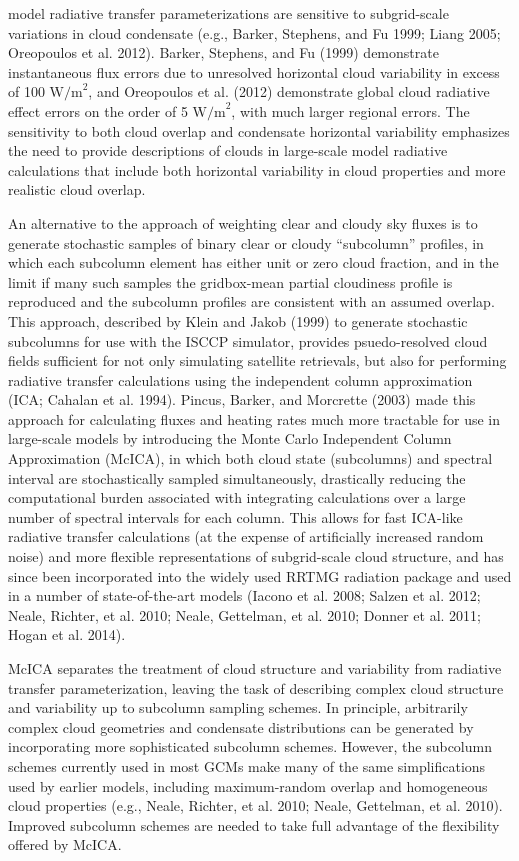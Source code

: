 model radiative transfer parameterizations are sensitive to
subgrid-scale variations in cloud condensate (e.g., Barker, Stephens,
and Fu 1999; Liang 2005; Oreopoulos et al. 2012). Barker, Stephens, and
Fu (1999) demonstrate instantaneous flux errors due to unresolved
horizontal cloud variability in excess of 100 \(\textrm{W/m}^2\), and
Oreopoulos et al. (2012) demonstrate global cloud radiative effect
errors on the order of 5 \(\textrm{W/m}^2\), with much larger regional
errors. The sensitivity to both cloud overlap and condensate horizontal
variability emphasizes the need to provide descriptions of clouds in
large-scale model radiative calculations that include both horizontal
variability in cloud properties and more realistic cloud overlap.

An alternative to the approach of weighting clear and cloudy sky fluxes
is to generate stochastic samples of binary clear or cloudy
``subcolumn'' profiles, in which each subcolumn element has either unit
or zero cloud fraction, and in the limit if many such samples the
gridbox-mean partial cloudiness profile is reproduced and the subcolumn
profiles are consistent with an assumed overlap. This approach,
described by Klein and Jakob (1999) to generate stochastic subcolumns
for use with the ISCCP simulator, provides psuedo-resolved cloud fields
sufficient for not only simulating satellite retrievals, but also for
performing radiative transfer calculations using the independent column
approximation (ICA; Cahalan et al. 1994). Pincus, Barker, and Morcrette
(2003) made this approach for calculating fluxes and heating rates much
more tractable for use in large-scale models by introducing the Monte
Carlo Independent Column Approximation (McICA), in which both cloud
state (subcolumns) and spectral interval are stochastically sampled
simultaneously, drastically reducing the computational burden associated
with integrating calculations over a large number of spectral intervals
for each column. This allows for fast ICA-like radiative transfer
calculations (at the expense of artificially increased random noise) and
more flexible representations of subgrid-scale cloud structure, and has
since been incorporated into the widely used RRTMG radiation package and
used in a number of state-of-the-art models (Iacono et al. 2008; Salzen
et al. 2012; Neale, Richter, et al. 2010; Neale, Gettelman, et al. 2010;
Donner et al. 2011; Hogan et al. 2014).

McICA separates the treatment of cloud structure and variability from
radiative transfer parameterization, leaving the task of describing
complex cloud structure and variability up to subcolumn sampling
schemes. In principle, arbitrarily complex cloud geometries and
condensate distributions can be generated by incorporating more
sophisticated subcolumn schemes. However, the subcolumn schemes
currently used in most GCMs make many of the same simplifications used
by earlier models, including maximum-random overlap and homogeneous
cloud properties (e.g., Neale, Richter, et al. 2010; Neale, Gettelman,
et al. 2010). Improved subcolumn schemes are needed to take full
advantage of the flexibility offered by McICA.

